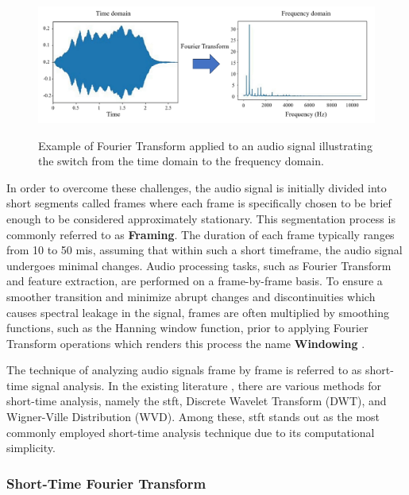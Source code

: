 \begin{figure}[htbp]
    \raggedright
        \caption{Example of Fourier Transform applied to an audio signal illustrating the switch from the time domain to the frequency domain.}
        \includegraphics[width=1.0\textwidth]{resources/images/030-theoretical_framework/Framework_digital_audio_fourier_transform.png}
        \label{fig:frmwk_digital_audio_fourier_transform}
\end{figure}

In order to overcome these challenges, the audio signal is initially divided into short segments called frames where each frame is specifically chosen to be brief enough to be considered approximately stationary. This segmentation process is commonly referred to as \textbf{Framing}. The duration of each frame typically ranges from 10 to 50 \gls{mi}\gls{s}, assuming that within such a short timeframe, the audio signal undergoes minimal changes. Audio processing tasks, such as Fourier Transform and feature extraction, are performed on a frame-by-frame basis. To ensure a smoother transition and minimize abrupt changes and discontinuities which causes spectral leakage in the signal, frames are often multiplied by smoothing functions, such as the Hanning window function, prior to applying Fourier Transform operations which renders this process the name \textbf{Windowing} \cite{Abreha2014}.

The technique of analyzing audio signals frame by frame is referred to as short-time signal analysis. In the existing literature \cite{Debnath2014}, there are various methods for short-time analysis, namely the \gls{stft}, Discrete Wavelet Transform (DWT), and Wigner-Ville Distribution (WVD). Among these, \gls{stft} stands out as the most commonly employed short-time analysis technique due to its computational simplicity.


\subsubsection{Short-Time Fourier Transform}
\label{subsubsec:audio_fundamentals_fourier_transform}

